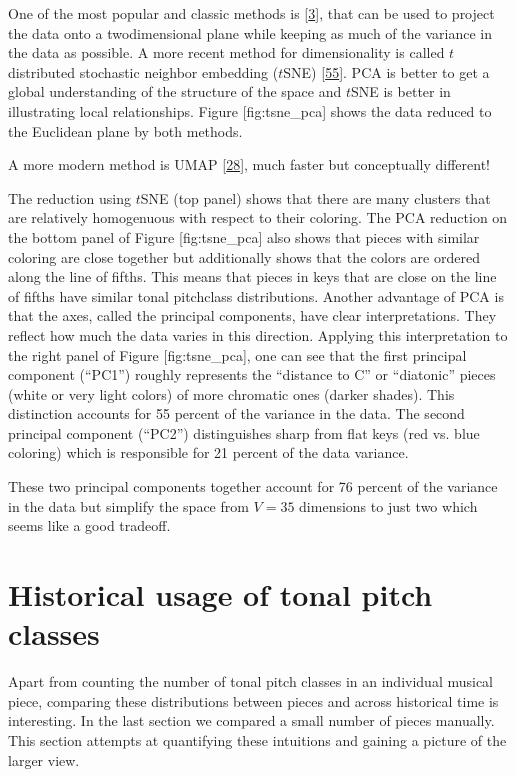 \documentclass[letterpaper,10pt,english]{sphinxmanual}
\begin{document}
\sphinxAtStartPar
One of the most popular and classic methods is  {[}\hyperlink{cite.8_bibliography:id60}{3}{]}, that can be used to project
the data onto a two\sphinxhyphen{}dimensional plane while keeping as much of the
variance in the data as possible. A more recent method for
dimensionality is called \(t\)\sphinxhyphen{}distributed stochastic neighbor
embedding (\(t\)\sphinxhyphen{}SNE) {[}\hyperlink{cite.8_bibliography:id62}{55}{]}. PCA is
better to get a global understanding of the structure of the space and
\(t\)\sphinxhyphen{}SNE is better in illustrating local relationships. Figure
{[}fig:tsne\_pca{]} shows the data reduced to the Euclidean plane by both
methods.

\sphinxAtStartPar
A more modern method is UMAP {[}\hyperlink{cite.8_bibliography:id61}{28}{]}, much faster but conceptually different!

\sphinxAtStartPar
The reduction using \(t\)\sphinxhyphen{}SNE (top panel) shows that there are many
clusters that are relatively homogenuous with respect to their coloring.
The PCA reduction on the bottom panel of Figure {[}fig:tsne\_pca{]} also
shows that pieces with similar coloring are close together but
additionally shows that the colors are ordered along the line of fifths.
This means that pieces in keys that are close on the line of fifths have
similar tonal pitch\sphinxhyphen{}class distributions. Another advantage of PCA is
that the axes, called the principal components, have clear
interpretations. They reflect how much the data varies in this
direction. Applying this interpretation to the right panel of Figure
{[}fig:tsne\_pca{]}, one can see that the first principal component (“PC1”)
roughly represents the “distance to C” or “diatonic” pieces (white or
very light colors) of more chromatic ones (darker shades). This
distinction accounts for 55 percent of the variance in the data. The
second principal component (“PC2”) distinguishes sharp from flat keys
(red vs. blue coloring) which is responsible for 21 percent of the data
variance.

\sphinxAtStartPar
These two principal components together account for 76 percent of the
variance in the data but simplify the space from \(V=35\) dimensions
to just two which seems like a good tradeoff.


\chapter{Historical usage of tonal pitch classes}
\label{\detokenize{5_notes:historical-usage-of-tonal-pitch-classes}}
\sphinxAtStartPar
Apart from counting the number of tonal pitch classes in an individual
musical piece, comparing these distributions between pieces and across
historical time is interesting. In the last section we compared a small
number of pieces manually. This section attempts at quantifying these
intuitions and gaining a picture of the larger view.
\end{document}
